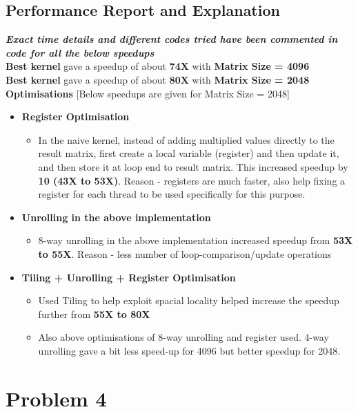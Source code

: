 \documentclass[a4paper]{article}
\begin{document}
\subsection{Performance Report and Explanation}
{\bf \emph{Exact time details and different codes tried have been commented in code for all the below speedups}}\\
\newline
{\bf Best kernel} gave a speedup of about {\bf 74X} with {\bf Matrix Size = 4096} \\
{\bf Best kernel} gave a speedup of about {\bf 80X} with {\bf Matrix Size = 2048} \\
\newline
{\bf \large Optimisations} [Below speedups are given for Matrix Size = 2048]
\begin{itemize}
\item {\bf Register Optimisation}
	\begin{itemize}
	\item In the naive kernel, instead of adding multiplied values directly to the result matrix, first create a local 
	variable (register) and then update it, and then store it at loop end to result matrix. This increased speedup
	by {\bf 10 (43X to 53X)}. Reason - registers are much faster, also help fixing a register for each thread to be
	used specifically for this purpose.
	\end{itemize}
\item {\bf Unrolling in the above implementation}
	\begin{itemize}
	\item 8-way unrolling in the above implementation increased speedup from {\bf 53X to 55X}. Reason - less
	number of loop-comparison/update operations
	\end{itemize}
\item {\bf Tiling + Unrolling + Register Optimisation}
	\begin{itemize}
	\item Used Tiling to help exploit spacial locality helped increase the speedup further from {\bf 55X to 80X}
	\item Also above optimisations of 8-way unrolling and register used. 4-way unrolling gave a bit less speed-up
	for 4096 but better speedup for 2048.
	\end{itemize}	
\end{itemize}


\newpage

\section{\Huge Problem 4}
\vspace{0.5cm}
\end{document}
